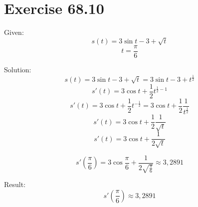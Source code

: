 \documentclass[a4paper, 10pt]{scrartcl}
\begin{document}
\section{Exercise 68.10}

Given:
\[s(t) = 3\sin{t} - 3 + \sqrt{t}\]
\[t = \frac{\pi}{6}\]

Solution:
\[s(t) = 3\sin{t} - 3 + \sqrt{t} = 3\sin{t} - 3 + t^{\frac{1}{2}}\]
\[s'(t) = 3\cos{t} + \frac{1}{2}t^{\frac{1}{2} - 1}\]
\[s'(t) = 3\cos{t} + \frac{1}{2}t^{-\frac{1}{2}} = 3\cos{t} + \frac{1}{2}\frac{1}{t^{\frac{1}{2}}}\]
\[s'(t) = 3\cos{t} + \frac{1}{2}\frac{1}{\sqrt{t}}\]
\[s'(t) = 3\cos{t} + \frac{1}{2\sqrt{t}}\]

\[s'(\frac{\pi}{6}) = 3\cos{\frac{\pi}{6}} + \frac{1}{2\sqrt{\frac{\pi}{6}}} \approx 3,2891\]

Result:
\[s'(\frac{\pi}{6}) \approx 3,2891\]
\end{document}
